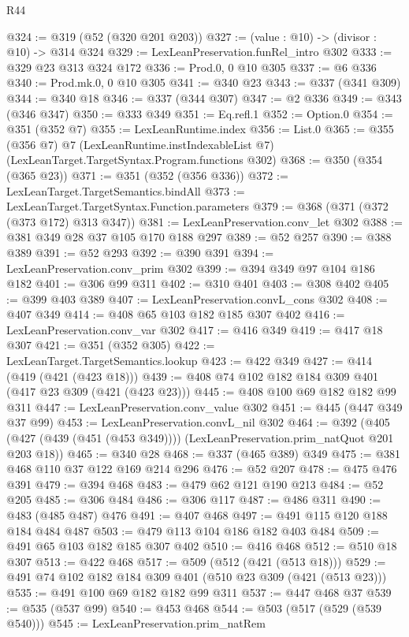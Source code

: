 \begin{lexlean}{R44}
\begin{coremodule}
@324 := @319 (@52 (@320 @201 @203))
@327 := (value : @10) -> (divisor : @10) -> @314 @324
@329 := LexLeanPreservation.funRel_intro @302
@333 := @329 @23 @313 @324 @172
@336 := Prod.{0, 0} @10 @305
@337 := @6 @336
@340 := Prod.mk.{0, 0} @10 @305
@341 := @340 @23
@343 := @337 (@341 @309)
@344 := @340 @18
@346 := @337 (@344 @307)
@347 := @2 @336
@349 := @343 (@346 @347)
@350 := @333 @349
@351 := Eq.refl.{1}
@352 := Option.{0}
@354 := @351 (@352 @7)
@355 := LexLeanRuntime.index
@356 := List.{0}
@365 := @355
    (@356 @7)
    @7
    (LexLeanRuntime.instIndexableList @7)
    (LexLeanTarget.TargetSyntax.Program.functions @302)
@368 := @350 (@354 (@365 @23))
@371 := @351 (@352 (@356 @336))
@372 := LexLeanTarget.TargetSemantics.bindAll
@373 := LexLeanTarget.TargetSyntax.Function.parameters
@379 := @368 (@371 (@372 (@373 @172) @313 @347))
@381 := LexLeanPreservation.conv_let @302
@388 := @381 @349 @28 @37 @105 @170 @188 @297
@389 := @52 @257
@390 := @388 @389
@391 := @52 @293
@392 := @390 @391
@394 := LexLeanPreservation.conv_prim @302
@399 := @394 @349 @97 @104 @186 @182
@401 := @306 @99 @311
@402 := @310 @401
@403 := @308 @402
@405 := @399 @403 @389
@407 := LexLeanPreservation.convL_cons @302
@408 := @407 @349
@414 := @408 @65 @103 @182 @185 @307 @402
@416 := LexLeanPreservation.conv_var @302
@417 := @416 @349
@419 := @417 @18 @307
@421 := @351 (@352 @305)
@422 := LexLeanTarget.TargetSemantics.lookup
@423 := @422 @349
@427 := @414 (@419 (@421 (@423 @18)))
@439 := @408 @74 @102 @182 @184 @309 @401 (@417 @23 @309 (@421 (@423 @23)))
@445 := @408 @100 @69 @182 @182 @99 @311
@447 := LexLeanPreservation.conv_value @302
@451 := @445 (@447 @349 @37 @99)
@453 := LexLeanPreservation.convL_nil @302
@464 := @392
    (@405 (@427 (@439 (@451 (@453 @349)))) (LexLeanPreservation.prim_natQuot @201 @203 @18))
@465 := @340 @28
@468 := @337 (@465 @389) @349
@475 := @381 @468 @110 @37 @122 @169 @214 @296
@476 := @52 @207
@478 := @475 @476 @391
@479 := @394 @468
@483 := @479 @62 @121 @190 @213
@484 := @52 @205
@485 := @306 @484
@486 := @306 @117
@487 := @486 @311
@490 := @483 (@485 @487) @476
@491 := @407 @468
@497 := @491 @115 @120 @188 @184 @484 @487
@503 := @479 @113 @104 @186 @182 @403 @484
@509 := @491 @65 @103 @182 @185 @307 @402
@510 := @416 @468
@512 := @510 @18 @307
@513 := @422 @468
@517 := @509 (@512 (@421 (@513 @18)))
@529 := @491 @74 @102 @182 @184 @309 @401 (@510 @23 @309 (@421 (@513 @23)))
@535 := @491 @100 @69 @182 @182 @99 @311
@537 := @447 @468 @37
@539 := @535 (@537 @99)
@540 := @453 @468
@544 := @503 (@517 (@529 (@539 @540)))
@545 := LexLeanPreservation.prim_natRem

\end{coremodule}
\end{lexlean}

